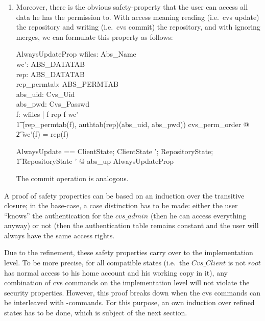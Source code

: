 \begin{enumerate}
\item Moreover, there is the obvious safety-property that the user can access
  all data he has the permission to.  With access meaning reading (i.e.\ cvs
  update) the repository and writing (i.e.\ cvs commit) the repository, and with
  ignoring merges, we can formulate this property as follows:
  \begin{schema}{AlwaysUpdateProp}
    wfiles: \power Abs\_Name \\
    wc': ABS\_DATATAB \\
    rep: ABS\_DATATAB \\
    rep\_permtab: ABS\_PERMTAB \\
    abs\_uid: Cvs\_Uid \\
    abs\_pwd: Cvs\_Passwd \\
    \where
    \forall f: wfiles | f \in \dom rep \land f \in \dom wc' \land \\
    \t1 (rep\_permtab(f), authtab(rep)(abs\_uid, abs\_pwd)) \in cvs\_perm\_order
    @ \\ 
    \t2 wc'(f) = rep(f) \\
  \end{schema}
  \begin{zed}
    AlwaysUpdate == \forall ClientState; ClientState '; RepositoryState; \\
    \t1 RepositoryState ' @ abs\_up \implies AlwaysUpdateProp \\
  \end{zed}
  The commit operation is analogous.
\end{enumerate}
 
A proof of safety properties can be based on an induction over the transitive
closure; in the base-case, a case distinction has to be made: either the user
``knows'' the authentication for the $cvs\_admin$ (then he can access everything
anyway) or not (then the authentication table remains constant and the user will
always have the same access rights. 

Due to the refinement, these safety properties carry over to the implementation
level. To be more precise, for all compatible states (i.e.\ the $Cvs\_Client$ is
not $root$ has normal access to his home account and his working copy in it),
any combination of cvs commands on the implementation level will not violate the
security properties.  However, this proof breaks down when the cvs commands can be
interleaved with \unix-commands. For this purpose, an own induction over refined
states has to be done, which is subject of the next section.


